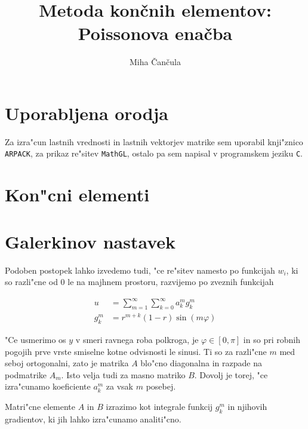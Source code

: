 \documentclass[a4paper,10pt]{article}
\title{Metoda kon\v cnih elementov: \\ Poissonova ena\v cba}
\author{Miha \v Can\v cula}
\renewcommand{\phi}{\varphi}
\begin{document}
\maketitle

\section{Uporabljena orodja}

Za izra"cun lastnih vrednosti in lastnih vektorjev matrike sem uporabil knji"znico \texttt{ARPACK}, za prikaz re"sitev \texttt{MathGL}, ostalo pa sem napisal v programskem jeziku \texttt{C}. 

\section{Kon"cni elementi}

\section{Galerkinov nastavek}
Podoben postopek lahko izvedemo tudi, "ce re"sitev namesto po funkcijah $w_i$, ki so razli"cne od 0 le na majhnem prostoru, razvijemo po zveznih funkcijah

\begin{align}
 u &= \sum_{m=1}^{\infty} \sum_{k=0}^{\infty} a_{k}^{m} g_{k}^{m} \\
 g_{k}^{m} &= r^{m+k} (1-r) \sin(m\phi)
\end{align}

"Ce usmerimo os $y$ v smeri ravnega roba polkroga, je $\phi \in [0,\pi]$ in so pri robnih pogojih prve vrste smiselne kotne odvisnosti le sinusi. Ti so za razli"cne $m$ med seboj ortogonalni, zato je matrika $A$ blo"cno diagonalna in razpade na podmatrike $A_m$. Isto velja tudi za masno matriko $B$. Dovolj je torej, "ce izra"cunamo koeficiente $a_{k}^{m}$ za vsak $m$ posebej. 

Matri"cne elemente $A$ in $B$ izrazimo kot integrale funkcij $g_{k}^{m}$ in njihovih gradientov, ki jih lahko izra"cunamo analiti"cno. 
\end{document}
